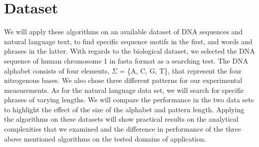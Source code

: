 \documentclass[paper=a4, fontsize=11pt]{scrartcl} %
\numberwithin{equation}{section} %
\numberwithin{figure}{section} %
\numberwithin{table}{section} %
\begin{document}
\newpage

\section{Dataset}
We will apply these algorithms on an available dataset of DNA sequences and natural language text, to find specific sequence motifs in the first, and words and phrases in the latter. With regards to the biological dataset, we selected  the DNA sequence of  human chromosome 1 in fasta format as a searching test. The DNA alphabet consists of four elements, $\Sigma$ = \{A, C, G, T\}, that represent  the four nitrogenous bases. We also chose three different patterns for our experimental measurements. As for the natural language data set, we will search for specific phrases of varying lengths. We will compare the performance in the two data sets to highlight the effect of the size of the alphabet and pattern length.
Applying the algorithms on these datasets will show practical results on the analytical complexities that we examined and the difference in performance of the three above mentioned algorithms on the tested domains of application.

\newpage

\nocite{*}
\end{document}
